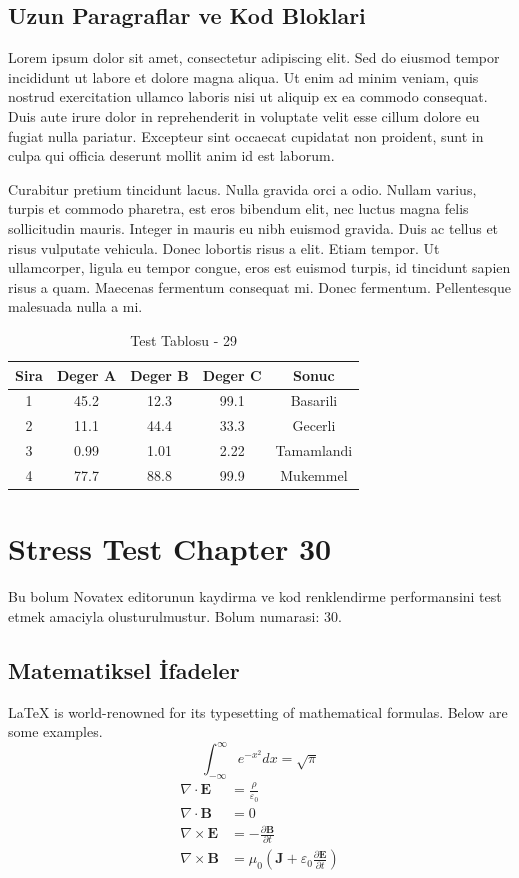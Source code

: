 \documentclass[12pt,a4paper]{article}
\begin{document}
\subsection{Uzun Paragraflar ve Kod Bloklari}
Lorem ipsum dolor sit amet, consectetur adipiscing elit. Sed do eiusmod tempor incididunt ut labore et dolore magna aliqua. Ut enim ad minim veniam, quis nostrud exercitation ullamco laboris nisi ut aliquip ex ea commodo consequat. Duis aute irure dolor in reprehenderit in voluptate velit esse cillum dolore eu fugiat nulla pariatur. Excepteur sint occaecat cupidatat non proident, sunt in culpa qui officia deserunt mollit anim id est laborum.

Curabitur pretium tincidunt lacus. Nulla gravida orci a odio. Nullam varius, turpis et commodo pharetra, est eros bibendum elit, nec luctus magna felis sollicitudin mauris. Integer in mauris eu nibh euismod gravida. Duis ac tellus et risus vulputate vehicula. Donec lobortis risus a elit. Etiam tempor. Ut ullamcorper, ligula eu tempor congue, eros est euismod turpis, id tincidunt sapien risus a quam. Maecenas fermentum consequat mi. Donec fermentum. Pellentesque malesuada nulla a mi.

\begin{table}[h!]
\centering
\begin{tabular}{|c|c|c|c|c|}
\hline
\textbf{Sira} & \textbf{Deger A} & \textbf{Deger B} & \textbf{Deger C} & \textbf{Sonuc} \\
\hline
1 & 45.2 & 12.3 & 99.1 & Basarili \\
2 & 11.1 & 44.4 & 33.3 & Gecerli \\
3 & 0.99 & 1.01 & 2.22 & Tamamlandi \\
4 & 77.7 & 88.8 & 99.9 & Mukemmel \\
\hline
\end{tabular}
\caption{Test Tablosu - 29}
\end{table}

\newpage
\section{Stress Test Chapter 30}
Bu bolum Novatex editorunun kaydirma ve kod renklendirme performansini test etmek amaciyla olusturulmustur. Bolum numarasi: 30.

\subsection{Matematiksel İfadeler}
\LaTeX{} is world-renowned for its typesetting of mathematical formulas. Below are some examples.
\begin{equation}
\int_{-\infty}^{\infty} e^{-x^2} dx = \sqrt{\pi}
\end{equation}
\begin{align}
\nabla \cdot \mathbf{E} &= \frac{\rho}{\varepsilon_0} \\
\nabla \cdot \mathbf{B} &= 0 \\
\nabla \times \mathbf{E} &= -\frac{\partial \mathbf{B}}{\partial t} \\
\nabla \times \mathbf{B} &= \mu_0\left(\mathbf{J} + \varepsilon_0 \frac{\partial \mathbf{E}}{\partial t}\right)
\end{align}
\end{document}
